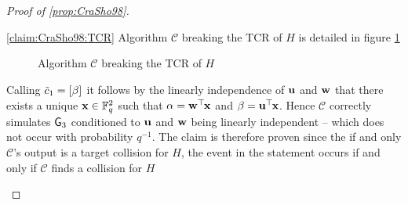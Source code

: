 \begin{proof}[Proof of \ref{prop:CraSho98}]
\begin{claimproof}{\ref{claim:CraSho98:TCR}}
	Algorithm $\mathcal{C}$ breaking the TCR of $H$ is detailed in figure \ref{prot:CraSho98:TCR}
	
\begin{figure}[htb]
	\centering
	\label{prot:CraSho98:TCR}
	\caption{Algorithm $\mathcal{C}$ breaking the TCR of $H$}
\end{figure}
	
	Calling $\tilde{c}_1 = \left[{\beta}\right]_{}$ it follows by the linearly independence of $\mathbf{u}$ and $\mathbf{w}$ that there exists a unique $\mathbf{x} \in \mathbb{F}_q^2$ such that $\alpha = \mathbf{w}^\top\hspace{-.1em} \mathbf{x}$ and $\beta = \mathbf{u}^\top\hspace{-.1em} \mathbf{x}$.
	Hence $\mathcal{C}$ correctly simulates $\mathsf{G}_3$ conditioned to $\mathbf{u}$ and $\mathbf{w}$ being linearly independent -- which does not occur with probability $q^{-1}$.
	The claim is therefore proven since the if and only $\mathcal{C}$'s output is a target collision for $H$, the event in the statement occurs if and only if $\mathcal{C}$ finds a collision for $H$
\end{claimproof}


\end{proof}
